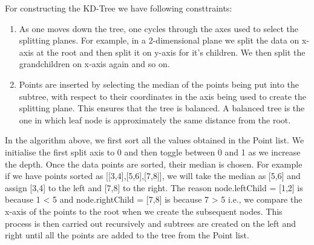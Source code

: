 \begin{algorithm}[H]
    \SetAlgoLined
\end{algorithm}

For constructing the KD-Tree we have following consttraints:


\begin{enumerate}
    \item {As one moves down the tree, one cycles through the axes used to select the splitting planes. For example, in a 2-dimensional plane we split the data on x-axis at the root and then split it on y-axis for it's children. We then split the grandchildren on x-axis again and so on.}
    \item {Points are inserted by selecting the median of the points being put into the subtree, with respect to their coordinates in the axis being used to create the splitting plane. This ensures that the tree is balanced. A balanced tree is the one in which leaf node is approximately the same distance from the root.}\\
\end{enumerate}    
    
In the algorithm above, we first sort all the values obtained in the Point list. We initialise the first split axis to 0 and then toggle between 0 and 1 as we increase the depth. Once the data points are sorted, their median is chosen. For example if we have points sorted as [[3,4],[5,6],[7,8]], we will take the median as [5,6] and assign [3,4] to the left and [7,8] to the right. The reason node.leftChild = [1,2] is because 1 < 5 and node.rightChild = [7,8] is because 7 > 5 i.e., we compare the x-axis of the points to the root when we create the subsequent nodes. This process is then carried out recursively and subtrees are created on the left and right until all the points are added to the tree from the Point list.

